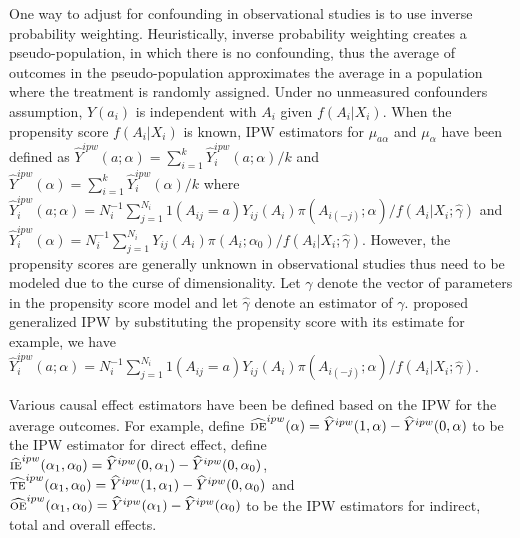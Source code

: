 \documentclass[oupdraft]{biostatistics}
\begin{document}
One way to adjust for confounding in observational studies is to use inverse probability weighting. Heuristically, inverse probability weighting creates a pseudo-population, in which there is no confounding, thus the average of outcomes in the pseudo-population approximates the average in a population where the treatment is randomly assigned. Under no unmeasured confounders assumption, $Y({a_i})$ is independent with $A_i$ given $f(A_i|X_i)$. When the propensity score $f(A_i|X_i)$ is known, IPW estimators for $\mu_{a\alpha}$ and $\mu_{\alpha}$ have been defined as $\widehat{Y}^{ipw}(a;\alpha)= \sum_{i=1}^k\widehat{Y}_i^{ipw}(a;\alpha)/k$ and $\widehat{Y}^{ipw}(\alpha)= \sum_{i=1}^k\widehat{Y}_i^{ipw}(\alpha)/k$ where $\widehat{Y}_i^{ipw}(a;\alpha)= N_i^{-1} \sum_{j=1}^{N_i}1(A_{ij}=a)Y_{ij}(A_{i})\pi(A_{i(-j)};\alpha)/{f}(A_i|X_i;\hat\gamma)$ and $\widehat{Y}_i^{ipw}(\alpha)= N_i^{-1} \sum_{j=1}^{N_i}Y_{ij}(A_{i})\pi(A_i;\alpha_0)/{f}(A_i|X_i;\hat\gamma)$. However, the propensity scores are generally unknown  in observational studies thus need to be modeled due to the curse of dimensionality. Let $\gamma$ denote the vector of parameters in the propensity score model and let $\hat\gamma$ denote an estimator of $\gamma$. \citet{tchetgen2012causal} proposed generalized IPW by substituting the propensity score with its estimate for example, we have $\widehat{Y}_i^{ipw}(a;\alpha)= N_i^{-1} \sum_{j=1}^{N_i}1(A_{ij}=a)Y_{ij}(A_{i})\pi(A_{i(-j)};\alpha)/{f}(A_i|X_i;\hat\gamma)$. 

Various causal effect estimators have been be defined based on the IPW for the average outcomes. For example, define $\widehat{\textsc{de}}^{ipw}(\alpha)=\widehat{Y}^{ipw}(1,\alpha)-\widehat{Y}^{ipw}(0,\alpha)$ to be the IPW estimator for direct effect, define $\widehat{\textsc{ie}}^{ipw}(\alpha_1,\alpha_0)=\widehat{Y}^{ipw}(0,\alpha_1)-\widehat{Y}^{ipw}(0,\alpha_0)$, $\widehat{\textsc{te}}^{ipw}(\alpha_1,\alpha_0)=\widehat{Y}^{ipw}(1,\alpha_1)-\widehat{Y}^{ipw}(0,\alpha_0)$ and $\widehat{\textsc{oe}}^{ipw}(\alpha_1,\alpha_0)=\widehat{Y}^{ipw}(\alpha_1)-\widehat{Y}^{ipw}(\alpha_0)$ to be the IPW estimators for indirect, total and overall effects. 
\end{document}
